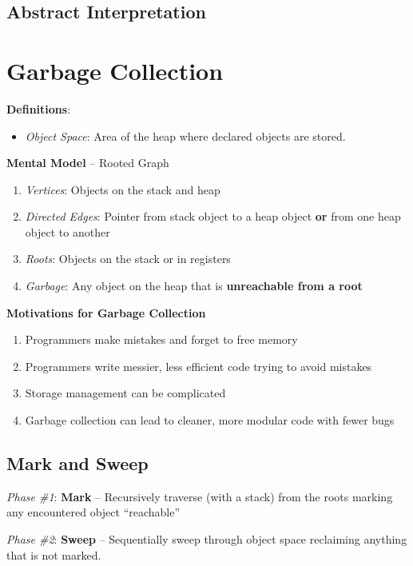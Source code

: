 \documentclass[10pt,twocolumn]{report}
\begin{document}
\subsection{Abstract Interpretation}


\section{Garbage Collection}

\textbf{Definitions}:

\begin{itemize}
  \item \textit{Object Space}: Area of the heap where declared objects are stored.
\end{itemize}

\textbf{Mental Model} -- Rooted Graph
\begin{enumerate}
  \item \textit{Vertices}: Objects on the stack and heap
  \item \textit{Directed Edges}: Pointer from stack object to a heap object \textbf{or} from one heap object to another
  \item \textit{Roots}: Objects on the stack or in registers
  \item \textit{Garbage}: Any object on the heap that is \textbf{unreachable from a root}
\end{enumerate}

\textbf{Motivations for Garbage Collection}
\begin{enumerate}
  \item Programmers make mistakes and forget to free memory
  \item Programmers write messier, less efficient code trying to avoid mistakes
  \item Storage management can be complicated
  \item Garbage collection can lead to cleaner, more modular code with fewer bugs
\end{enumerate}

\subsection*{Mark and Sweep}
\textit{Phase \#1}: \textbf{Mark} -- Recursively traverse (with a stack) from the roots marking any encountered object ``reachable''

\textit{Phase \#2}: \textbf{Sweep} -- Sequentially sweep through object space reclaiming anything that is not marked.
\end{document}
